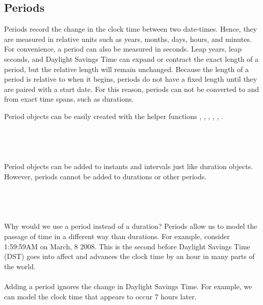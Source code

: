\documentclass[article]{jss}
\begin{document}
\subsection{Periods}
\label{sec:periods}

Periods record the change in the clock time between two date-times. Hence, they are measured in relative units such as years, months, days, hours, and minutes.  For convenience, a period can also be measured in seconds. Leap years, leap seconds, and Daylight Savings Time can expand or contract the exact length of a period, but the relative length will remain unchanged. Because the length of a period is relative to when it begins, periods do not have a fixed length until they are paired with a start date. For this reason, periods can not be converted to and from exact time spans, such as durations.

Period objects can be easily created with the helper functions , , , , , . \\

\\
\\

\\
\\

Period objects can be added to instants and intervals just like duration objects. However, periods cannot be added to durations or other periods.\\

\\
\\
\\
\\

Why would we use a period instead of a duration? Periods allow us to model the passage of time in a different way than durations. For example, consider 1:59:59AM on March, 8 2008. This is the second before Daylight Savings Time (DST) goes into affect and advances the clock time by an hour in many parts of the world.\\

\\

Adding a period ignores the change in Daylight Savings Time. For example, we can model the clock time that appears to occur 7 hours later.\\
\end{document}
